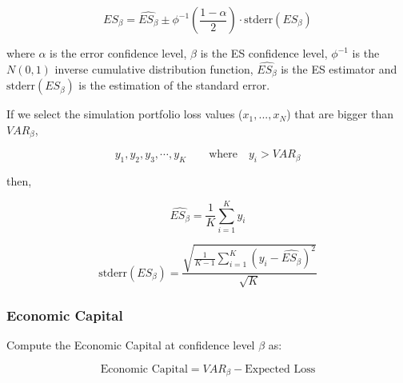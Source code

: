\documentclass[a4paper,12pt,final]{article}
\begin{document}
\begin{displaymath}
ES_{\beta} = \widehat{ES_{\beta}} \pm \phi^{-1}\left(\frac{1-\alpha}{2}\right) \cdot \textrm{stderr}(ES_{\beta})
\end{displaymath}

where $\alpha$ is the error confidence level, $\beta$ is the ES confidence 
level, $\phi^{-1}$ is the $N(0,1)$ inverse cumulative distribution function, 
$\widehat{ES_{\beta}}$ is the ES estimator and $\textrm{stderr}(ES_{\beta})$
is the estimation of the standard error.
\newline

If we select the simulation portfolio loss values ($x_1, ..., x_N$) that are bigger 
than $VAR_{\beta}$,

\begin{displaymath}
y_1, y_2, y_3, \cdots, y_K \qquad \textrm{where} \quad y_i > VAR_{\beta}
\end{displaymath}

then,

\begin{displaymath}
\widehat{ES_{\beta}} = \frac{1}{K} \sum_{i=1}^{K} y_i
\end{displaymath}

\begin{displaymath}
\textrm{stderr}(ES_{\beta}) =
\frac{\sqrt{\frac{1}{K-1} \sum_{i=1}^{K} \left( y_i - \widehat{ES_{\beta}} \right)^2}}{\sqrt{K}}
\end{displaymath}

\subsubsection{Economic Capital}
Compute the Economic Capital at confidence level $\beta$ as:

\begin{displaymath}
\textrm{Economic Capital} = VAR_{\beta} - \textrm{Expected Loss}
\end{displaymath}

\end{document}
